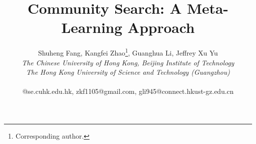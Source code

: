 \documentclass[conference]{IEEEtran}
\begin{document}
\title{Community Search: A Meta-Learning Approach}

\author{%
	{Shuheng Fang, Kangfei Zhao\thanks{ Corresponding author.}, Guanghua Li, Jeffrey Xu Yu} 
	\vspace{1.6mm}\\
	\fontsize{10}{10}\selectfont\itshape
	The Chinese University of Hong Kong,
	Beijing Institute of Technology\\
	The Hong Kong University of Science and Technology (Guangzhou)\\
	
	\fontsize{9}{9}\selectfont\ttfamily\upshape
	
	@se.cuhk.edu.hk, zkf1105@gmail.com,
	gli945@connect.hkust-gz.edu.cn
	\fontsize{9}{9}\selectfont\ttfamily\upshape
	\vspace{-0.6cm}
}
\vspace{-0.6cm}


\maketitle
\thispagestyle{plain}



\end{document}
